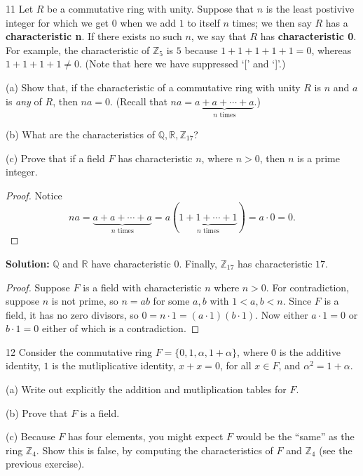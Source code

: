 \begin{problem}{11}
    Let $R$ be a commutative ring with unity.
    Suppose that $n$ is the least postivive integer 
    for which we get $0$ when we add $1$ to itself $n$
    times; we then say $R$ has a \textbf{characteristic n}.
    If there exists no such $n$, we say that $R$ has 
    \textbf{characteristic 0}. For example, the 
    characteristic of $\mathbb{Z}_5$ is $5$ because 
    $1 + 1 + 1 + 1 + 1 = 0$, whereas 
    $1 + 1 + 1 + 1 \ne 0$. (Note that here we 
    have suppressed `[' and `]'.)

    (a) Show that, if the characteristic of a commutative ring with unity $R$ 
        is $n$ and $a$ is \emph{any} of $R$, then $na = 0$. (Recall that 
        $na = \underbrace{a + a + \cdots + a}_{n \text{ times}}$.)

    (b) What are the characteristics of $\mathbb{Q}, \mathbb{R}, \mathbb{Z}_{17}$?

    (c) Prove that if a field $F$ has characteristic $n$, where $n > 0$, 
        then $n$ is a prime integer.
\end{problem}
\solved

\begin{proof}
    Notice
    \[
    na = \underbrace{a + a + \cdots + a}_{n \text{ times}}
       = a(\underbrace{1 + 1 + \cdots + 1}_{n \text{ times}})
       = a \cdot 0
       = 0.
    \]
\end{proof}

\textbf{Solution:} $\mathbb{Q}$ and $\mathbb{R}$ have characteristic $0$.
Finally, $\mathbb{Z}_{17}$ has characteristic $17$.

\begin{proof}
    Suppose $F$ is a field with characteristic $n$ where $n > 0$.
    For contradiction, suppose $n$ is not prime, so $n = ab$ for some
    $a,b$ with $1 < a,b < n$.
    Since $F$ is a field, it has no zero divisors, so
    $
    0 = n \cdot 1 = (a \cdot 1)(b \cdot 1)
    $.
    Now either $a \cdot 1 = 0$ or $b \cdot 1 = 0$ either of which is a contradiction.
\end{proof}

\begin{problem}{12}
    Consider the commutative ring $F = \{0, 1, \alpha, 1 + \alpha\}$,
    where $0$ is the additive identity, $1$ is the mutliplicative identity,
    $x + x = 0$, for all $x \in F$, and $\alpha^2 = 1 + \alpha$.

    (a) Write out explicitly the addition and mutliplication tables for $F$.

    (b) Prove that $F$ is a field.

    (c) Because $F$ has four elements, you might expect $F$ would be the ``same''
        as the ring $\mathbb{Z}_4$. Show this is false, by computing the characteristics 
        of $F$ and $\mathbb{Z}_4$ (see the previous exercise).
\end{problem}
\solved

